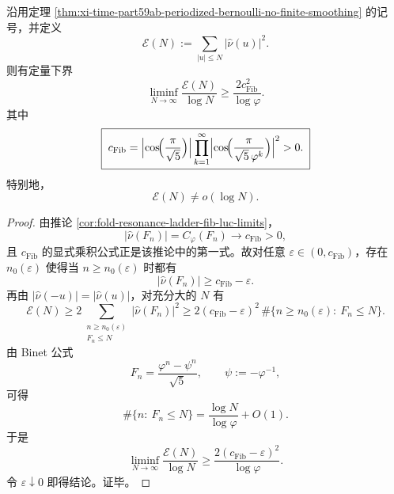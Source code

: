 \begin{corollary}\label{cor:xi-time-part59ab-periodized-log-energy-fib}
沿用定理 \ref{thm:xi-time-part59ab-periodized-bernoulli-no-finite-smoothing} 的记号，并定义
\[
\mathcal E(N):=\sum_{|u|\le N}|\widehat\nu(u)|^2.
\]
则有定量下界
\[
\boxed{\;
\liminf_{N\to\infty}\frac{\mathcal E(N)}{\log N}
\ge
\frac{2c_{\mathrm{Fib}}^2}{\log\varphi}.\;}
\]
其中
\[
\boxed{\;
c_{\mathrm{Fib}}
=
\Bigl|\cos\!\Bigl(\frac{\pi}{\sqrt5}\Bigr)\Bigr|
\prod_{k=1}^{\infty}
\Bigl|\cos\!\Bigl(\frac{\pi}{\sqrt5\,\varphi^k}\Bigr)\Bigr|^2
>0.\;}
\]
特别地，
\[
\mathcal E(N)\neq o(\log N).
\]
\end{corollary}
\begin{proof}
由推论 \ref{cor:fold-resonance-ladder-fib-luc-limits}，
\[
\bigl|\widehat\nu(F_n)\bigr|
=
C_\varphi(F_n)\longrightarrow c_{\mathrm{Fib}}>0,
\]
且 \(c_{\mathrm{Fib}}\) 的显式乘积公式正是该推论中的第一式。故对任意
\(\varepsilon\in(0,c_{\mathrm{Fib}})\)，存在 \(n_0(\varepsilon)\) 使得当 \(n\ge n_0(\varepsilon)\) 时都有
\[
\bigl|\widehat\nu(F_n)\bigr|\ge c_{\mathrm{Fib}}-\varepsilon.
\]
再由 \(|\widehat\nu(-u)|=|\widehat\nu(u)|\)，对充分大的 \(N\) 有
\[
\mathcal E(N)
\ge
2\sum_{\substack{n\ge n_0(\varepsilon)\\ F_n\le N}}
\bigl|\widehat\nu(F_n)\bigr|^2
\ge
2(c_{\mathrm{Fib}}-\varepsilon)^2\,
\#\{n\ge n_0(\varepsilon):\ F_n\le N\}.
\]
由 Binet 公式
\[
F_n=\frac{\varphi^n-\psi^n}{\sqrt5},
\qquad
\psi:=-\varphi^{-1},
\]
可得
\[
\#\{n:\ F_n\le N\}=\frac{\log N}{\log\varphi}+O(1).
\]
于是
\[
\liminf_{N\to\infty}\frac{\mathcal E(N)}{\log N}
\ge
\frac{2(c_{\mathrm{Fib}}-\varepsilon)^2}{\log\varphi}.
\]
令 \(\varepsilon\downarrow 0\) 即得结论。证毕。
\end{proof}

